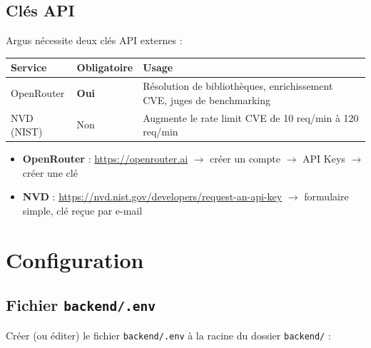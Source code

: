 \documentclass[a4paper, 12pt, hidelinks]{article}
\begin{document}
\subsection*{Clés API}

Argus nécessite deux clés API externes :

\begin{table}[H]
  \centering
  \begin{tabularx}{\textwidth}{l l X}
    \toprule
    \textbf{Service} & \textbf{Obligatoire} & \textbf{Usage} \\
    \midrule
    OpenRouter & \textbf{Oui} & Résolution de bibliothèques, enrichissement CVE, juges de benchmarking \\
    NVD (NIST) & Non & Augmente le rate limit CVE de 10 req/min à 120 req/min \\
    \bottomrule
  \end{tabularx}
\end{table}

\begin{itemize}
  \item \textbf{OpenRouter} : \url{https://openrouter.ai} $\rightarrow$ créer un compte $\rightarrow$ API Keys $\rightarrow$ créer une clé
  \item \textbf{NVD} : \url{https://nvd.nist.gov/developers/request-an-api-key} $\rightarrow$ formulaire simple, clé reçue par e-mail
\end{itemize}

\section{Configuration}
\label{sec:config}

\subsection*{Fichier \texttt{backend/.env}}

Créer (ou éditer) le fichier \texttt{backend/.env} à la racine du dossier \texttt{backend/} :
\end{document}
